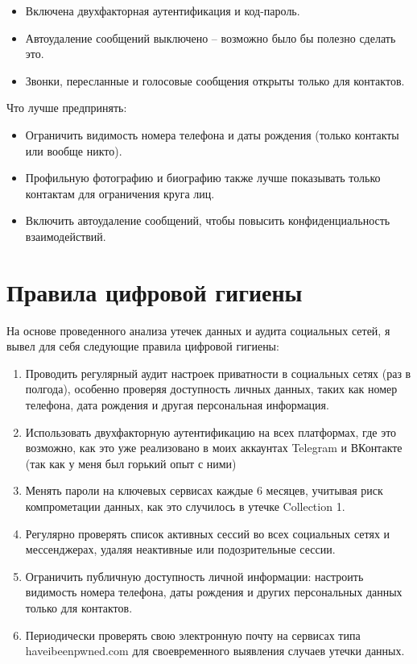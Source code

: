 \documentclass{article}
\begin{document}
\begin{itemize}
    \item Включена двухфакторная аутентификация и код-пароль.
    \item Автоудаление сообщений выключено -- возможно было бы полезно сделать это.
    \item Звонки, пересланные и голосовые сообщения открыты только для контактов.
\end{itemize}

Что лучше предпринять:

\begin{itemize}
    \item Ограничить видимость номера телефона и даты рождения (только контакты или вообще никто).
    \item Профильную фотографию и биографию также лучше показывать только контактам для ограничения круга лиц.
    \item Включить автоудаление сообщений, чтобы повысить конфиденциальность взаимодействий.
\end{itemize}

\section{Правила цифровой гигиены}

На основе проведенного анализа утечек данных и аудита социальных сетей, я вывел для себя следующие правила цифровой гигиены:

\begin{enumerate}
    \item Проводить регулярный аудит настроек приватности в социальных сетях (раз в полгода), особенно проверяя доступность личных данных, таких как номер телефона, дата рождения и другая персональная информация.
    
    \item Использовать двухфакторную аутентификацию на всех платформах, где это возможно, как это уже реализовано в моих аккаунтах Telegram и ВКонтакте (так как у меня был горький опыт с ними)
    
    \item Менять пароли на ключевых сервисах каждые 6 месяцев, учитывая риск компрометации данных, как это случилось в утечке Collection 1.
    
    \item Регулярно проверять список активных сессий во всех социальных сетях и мессенджерах, удаляя неактивные или подозрительные сессии.
    
    \item Ограничить публичную доступность личной информации: настроить видимость номера телефона, даты рождения и других персональных данных только для контактов.
    
    \item Периодически проверять свою электронную почту на сервисах типа haveibeenpwned.com для своевременного выявления случаев утечки данных.
\end{enumerate}
\end{document}
